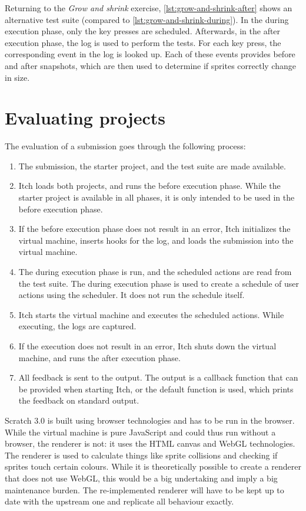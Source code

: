 \documentclass[../main]{subfiles}
\begin{document}
Returning to the \emph{Grow and shrink} exercise, \cref{lst:grow-and-shrink-after} shows an alternative test suite (compared to \cref{lst:grow-and-shrink-during}).
In the during execution phase, only the key presses are scheduled.
Afterwards, in the after execution phase, the log is used to perform the tests.
For each key press, the corresponding event in the log is looked up.
Each of these events provides before and after snapshots, which are then used to determine if sprites correctly change in size.

\section{Evaluating projects}\label{sec:itch-evaluating-projects}

The evaluation of a submission goes through the following process:

\begin{enumerate}
    \item The submission, the starter project, and the test suite are made available.
    \item Itch loads both projects, and runs the before execution phase.
        While the starter project is available in all phases, it is only intended to be used in the before execution phase.
    \item If the before execution phase does not result in an error, Itch initializes the virtual machine, inserts hooks for the log, and loads the submission into the virtual machine.
    \item The during execution phase is run, and the scheduled actions are read from the test suite.
        The during execution phase is used to create a schedule of user actions using the scheduler.
        It does not run the schedule itself.
    \item Itch starts the virtual machine and executes the scheduled actions.
          While executing, the logs are captured.
    \item If the execution does not result in an error, Itch shuts down the virtual machine, and runs the after execution phase.
    \item All feedback is sent to the output.
        The output is a callback function that can be provided when starting Itch, or the default function is used, which prints the feedback on standard output.
\end{enumerate}

Scratch 3.0 is built using browser technologies and has to be run in the browser.
While the virtual machine is pure JavaScript and could thus run without a browser, the renderer is not: it uses the HTML canvas and WebGL technologies.
The renderer is used to calculate things like sprite collisions and checking if sprites touch certain colours.
While it is theoretically possible to create a renderer that does not use WebGL, this would be a big undertaking and imply a big maintenance burden.
The re-implemented renderer will have to be kept up to date with the upstream one and replicate all behaviour exactly.
\end{document}
